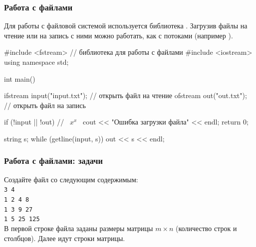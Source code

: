 \begin{frame}[fragile]
	\frametitle{Работа с файлами}
	Для работы с файловой системой используется библиотека . Загрузив
	файлы на чтение или на запись с ними можно работать, как с потоками
	(например ).
\begin{code}
#include <fstream> // библиотека для работы с файлами
#include <iostream>
using namespace std;

int main()
{
	ifstream input("input.txt"); // открыть файл на чтение
	ofstream out("out.txt"); // открыть файл на запись

	if (!input || !out) // ~$x^x$~
	{
		cout << "Ошибка загрузки файла" << endl;
		return 0;
	}

	string s;
	while (getline(input, s))
		out << s << endl;
}
	\end{code}
\end{frame}

\begin{frame}
	\frametitle{Работа с файлами: задачи}
	Создайте файл  со следующим содержимым:
	{\\ \tt 3 4 \\ 1 2 4 8 \\ 1 3 9 27 \\ 1 5 25 125 \\}
	В первой строке файла заданы размеры матрицы $m \times n$ (количество строк и
	столбцов). Далее идут строки матрицы. \\

\end{frame}

